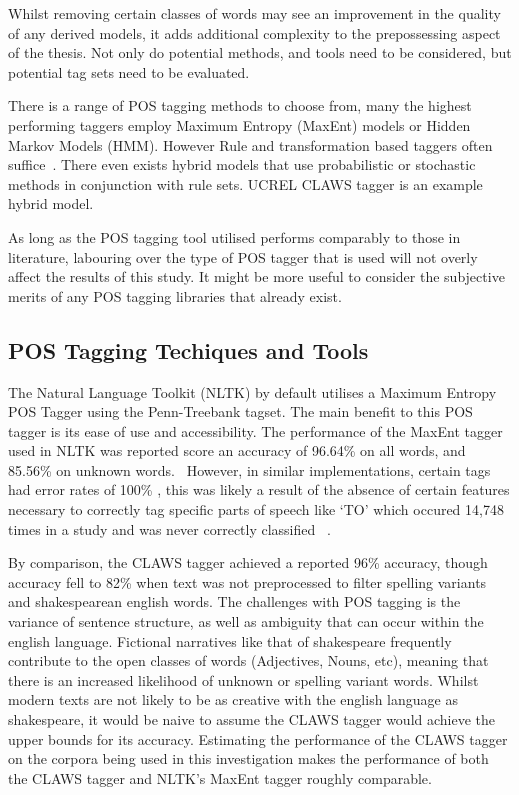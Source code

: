 \documentclass[10pt]{report}
\begin{document}
Whilst removing certain classes of words may see an improvement in the quality of any derived models, it adds additional complexity to the prepossessing aspect of the thesis. Not only do potential methods, and tools need to be considered, but potential tag sets need to be evaluated.

There is a range of POS tagging methods to choose from, many the highest performing taggers employ Maximum Entropy (MaxEnt) models or Hidden Markov Models (HMM). However Rule and transformation based taggers often suffice~\cite{Brill1995-sr,Brill1992-hh,Huang2009-xb,Cutting1992-vx}. There even exists hybrid models that use probabilistic or stochastic methods in conjunction with rule sets. UCREL CLAWS tagger is an example hybrid model.~\cite{Leech1994-rh}

As long as the POS tagging tool utilised performs comparably to those in literature, labouring over the type of POS tagger that is used will not overly affect the results of this study. It might be more useful to consider the subjective merits of any POS tagging libraries that already exist.

\subsection{POS Tagging Techiques and Tools}
The Natural Language Toolkit (NLTK) by default utilises a Maximum Entropy POS Tagger using the Penn-Treebank tagset. The main benefit to this POS tagger is its ease of use and accessibility. The performance of the MaxEnt tagger used in NLTK was reported score an accuracy of 96.64\% on all words, and 85.56\% on unknown words.~\cite{Ratnaparkhi1996-oa} However, in similar implementations, certain tags had error rates of 100\% , this was likely a result of the absence of certain features necessary to correctly tag specific parts of speech like ‘TO’ which occured 14,748 times in a study and was never correctly classified ~\cite{Malecha2010-fl}. 

By comparison, the CLAWS tagger achieved a reported 96\% accuracy, though accuracy fell to 82\% when text was not preprocessed to filter spelling variants and shakespearean english words. The challenges with POS tagging is the variance of sentence structure, as well as ambiguity that can occur within the english language. Fictional narratives like that of shakespeare frequently contribute to the open classes of words (Adjectives, Nouns, etc), meaning that there is an increased likelihood of unknown or spelling variant words. Whilst modern texts are not likely to be as creative with the english language as shakespeare, it would be naive to assume the CLAWS tagger would achieve the upper bounds for its accuracy. Estimating the performance of the CLAWS tagger on the corpora being used in this investigation makes the performance of both the CLAWS tagger and NLTK’s MaxEnt tagger roughly comparable.
\end{document}
